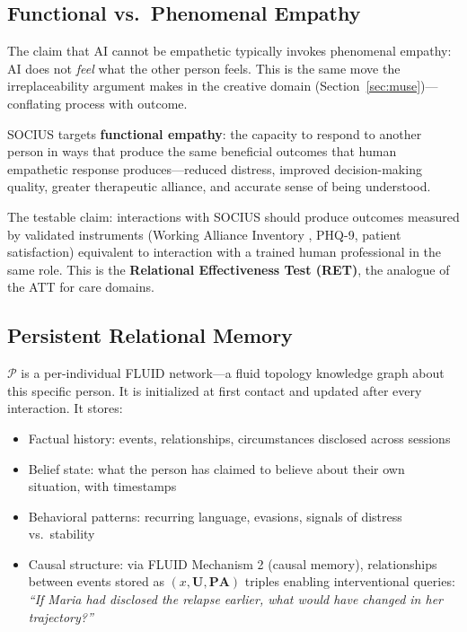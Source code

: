\documentclass[12pt]{article}
\begin{document}
\subsection{Functional vs.\ Phenomenal Empathy}

The claim that AI cannot be empathetic typically invokes phenomenal empathy: AI does not \textit{feel} what the other person feels. This is the same move the irreplaceability argument makes in the creative domain (Section~\ref{sec:muse})---conflating process with outcome.

SOCIUS targets \textbf{functional empathy}: the capacity to respond to another person in ways that produce the same beneficial outcomes that human empathetic response produces---reduced distress, improved decision-making quality, greater therapeutic alliance, and accurate sense of being understood.

The testable claim: interactions with SOCIUS should produce outcomes measured by validated instruments (Working Alliance Inventory \cite{horvath1989}, PHQ-9, patient satisfaction) equivalent to interaction with a trained human professional in the same role. This is the \textbf{Relational Effectiveness Test (RET)}, the analogue of the ATT for care domains.

\subsection{Persistent Relational Memory}

$\mathcal{P}$ is a per-individual FLUID network---a fluid topology knowledge graph about this specific person. It is initialized at first contact and updated after every interaction. It stores:

\begin{itemize}
    \item Factual history: events, relationships, circumstances disclosed across sessions
    \item Belief state: what the person has claimed to believe about their own situation, with timestamps
    \item Behavioral patterns: recurring language, evasions, signals of distress vs.\ stability
    \item Causal structure: via FLUID Mechanism 2 (causal memory), relationships between events stored as $(x, \mathbf{U}, \mathbf{PA})$ triples enabling interventional queries: \textit{``If Maria had disclosed the relapse earlier, what would have changed in her trajectory?''}
\end{itemize}
\end{document}
